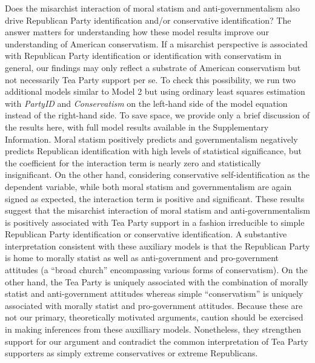 \documentclass[12pt,]{article}
\begin{document}
Does the misarchist interaction of moral statism and
anti-governmentalism also drive Republican Party identification and/or
conservative identification? The answer matters for understanding how
these model results improve our understanding of American conservatism.
If a misarchist perspective is associated with Republican Party
identification or identification with conservatism in general, our
findings may only reflect a substrate of American conservatism but not
necessarily Tea Party support per se. To check this possibility, we run
two additional models similar to Model 2 but using ordinary least
squares estimation with \emph{PartyID} and \emph{Conservatism} on the
left-hand side of the model equation instead of the right-hand side. To
save space, we provide only a brief discussion of the results here, with
full model results available in the Supplementary Information. Moral
statism positively predicts and governmentalism negatively predicts
Republican identification with high levels of statistical significance,
but the coefficient for the interaction term is nearly zero and
statistically insignificant. On the other hand, considering conservative
self-identification as the dependent variable, while both moral statism
and governmentalism are again signed as expected, the interaction term
is positive and significant. These results suggest that the misarchist
interaction of moral statism and anti-governmentalism is positively
associated with Tea Party support in a fashion irreducible to simple
Republican Party identification or conservative identification. A
substantive interpretation consistent with these auxiliary models is
that the Republican Party is home to morally statist as well as
anti-government and pro-government attitudes (a ``broad church''
encompassing various forms of conservatism). On the other hand, the Tea
Party is uniquely associated with the combination of morally statist and
anti-government attitudes whereas simple ``conservatism'' is uniquely
associated with morally statist and pro-government attitudes. Because
these are not our primary, theoretically motivated arguments, caution
should be exercised in making inferences from these auxilliary models.
Nonetheless, they strengthen support for our argument and contradict the
common interpretation of Tea Party supporters as simply extreme
conservatives or extreme Republicans.

\singlespacing
\end{document}
